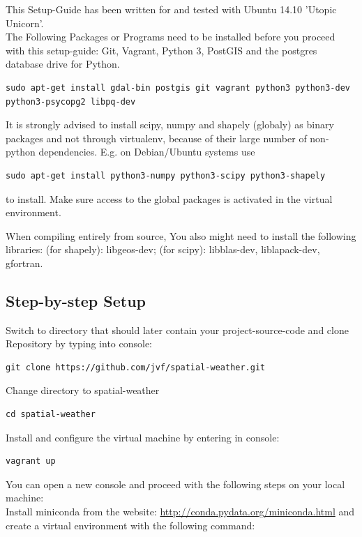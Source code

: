 \documentclass[paper=a4, fontsize=11pt]{article} %
\numberwithin{equation}{section} %
\numberwithin{figure}{section} %
\numberwithin{table}{section} %
\begin{document}
This Setup-Guide has been written for and tested with Ubuntu 14.10 'Utopic Unicorn'.\\
The Following Packages or Programs need to be installed before you proceed with this setup-guide: Git, Vagrant, Python 3, PostGIS and the postgres database drive for Python.

\begin{lstlisting}
sudo apt-get install gdal-bin postgis git vagrant python3 python3-dev python3-psycopg2 libpq-dev
\end{lstlisting}

It is strongly advised to install scipy, numpy and shapely (globaly) as
binary packages and not through virtualenv, because of their large
number of non-python dependencies. E.g. on Debian/Ubuntu systems use
\begin{lstlisting}
sudo apt-get install python3-numpy python3-scipy python3-shapely
\end{lstlisting}
to install. Make sure access to the global packages is activated in the
virtual environment.

When compiling entirely from source, You also might need to install the
following libraries: (for shapely): libgeos-dev; (for scipy):
libblas-dev, liblapack-dev, gfortran.

\subsection{Step-by-step Setup}
Switch to directory that should later contain your project-source-code and clone Repository by typing into console:
\begin{lstlisting}
git clone https://github.com/jvf/spatial-weather.git
\end{lstlisting}

Change directory to spatial-weather
\begin{lstlisting}
cd spatial-weather
\end{lstlisting}

Install and configure the virtual machine by entering in console:
\begin{lstlisting}
vagrant up
\end{lstlisting}

You can open a new console and proceed with the following steps on your local machine:\\
Install miniconda from the website:
\url{http://conda.pydata.org/miniconda.html} and create a virtual environment with the following command:
\end{document}
